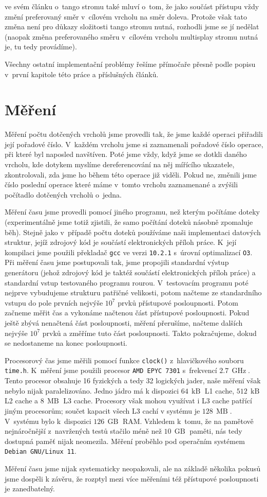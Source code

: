 \citet{tango} ve svém článku o~tango stromu také mluví o~tom, že jako součást přístupu vždy změní preferovaný směr v~cílovém vrcholu na směr doleva. Protože však tato změna není pro důkazy složitosti tango stromu nutná, rozhodli jsme se jí nedělat (naopak změna preferovaného směru v~cílovém vrcholu multisplay stromu nutná je, tu tedy provádíme).

Všechny ostatní implementační problémy řešíme přímočaře přesně podle popisu v~první kapitole této práce a příslušných článků.

\section{Měření}

Měření počtu dotčených vrcholů jsme provedli tak, že jsme každé operaci 
přiřadili její pořadové číslo. V~každém vrcholu jsme si zaznamenali pořadové číslo
operace, při které byl naposled navštíven. Poté jsme vždy, když jsme se dotkli daného
vrcholu, kde dotykem myslíme dereferencování na něj mířícího ukazatele,
zkontrolovali, zda jsme ho během této operace již viděli. Pokud ne, změnili jsme
číslo poslední operace které máme v~tomto vrcholu zaznamenané a zvýšili
počítadlo dotčených vrcholů o~jedna.

Měření času jsme provedli pomocí jiného programu, než kterým počítáme doteky
(experimentálně jsme totiž zjistili, že samo počítání doteků násobně zpomaluje
běh). Stejně jako v~případě počtu doteků používáme naši implementaci datových
struktur, jejíž zdrojový kód je součástí elektronických příloh práce. K~její
kompilaci jsme použili překladač {\tt gcc} ve verzi {\tt 10.2.1} s~úrovní
optimalizací {\tt O3}. Při měření času jsme postupovali tak, jsme propojili standardní výstup generátoru (jehož zdrojový kód je
taktéž součástí elektronických příloh práce) a standardní vstup testovaného
programu rourou. V~testovacím programu poté nejprve vybudujeme
strukturu patřičné velikosti, potom načteme ze standardního vstupu do pole
prvních nejvýše $10^7$ prvků přístupové posloupnosti. Potom začneme měřit
čas a vykonáme načtenou část přístupové posloupnosti. Pokud ještě zbývá
nenačtená část posloupnosti, měření přerušíme, načteme dalších nejvýše
$10^7$ prvků a změříme tuto část posloupnosti. Takto pokračujeme, dokud
se nedostaneme na konec posloupnosti.

Procesorový čas jsme měřili pomocí funkce {\tt clock()} z~hlavičkového souboru
{\tt time.h}. K~měření jsme použili procesor {\tt AMD EPYC 7301}
s~frekvencí  $2.7\, \operatorname{GHz}$. Tento procesor obsahuje 16 fyzických a tedy
32 logických jader, naše měření však nebylo nijak paralelizováno. Jedno jádro má k dispozici $64\,\operatorname{kB}$ L1 cache, $512\,\operatorname{kB}$ L2 cache a $8\,\operatorname{MB}$ L3 cache. Procesory však mohou využívat i L3 cache patřící jiným procesorům; součet kapacit všech L3 cachí v systému je $128\,\operatorname{MB}$. V~systému bylo
k~dispozici $126\,\operatorname{GB}$ RAM. Vzhledem k~tomu, že na pamětově
nejnáročnější z~navržených testů stačilo méně než $10\,\operatorname{GB}$
paměti, nás tedy dostupná paměť nijak neomezila. Měření proběhlo pod operačním
systémem {\tt Debian GNU/Linux 11}.

Měření času jsme nijak systematicky neopakovali, ale na základě několika pokusů jsme dospěli k závěru, že rozptyl mezi více měřeními též přístupové posloupnosti je zanedbatelný.
